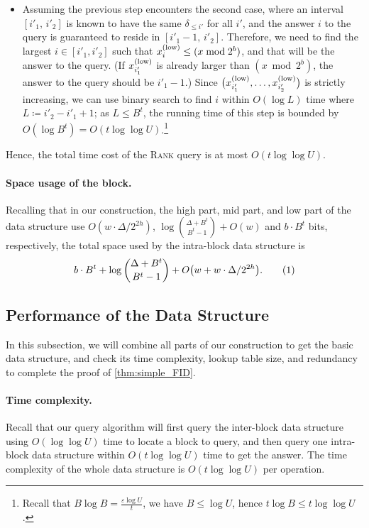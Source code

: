 \documentclass{article}
\theoremstyle{plain}
\theoremstyle{definition}  \newtheorem{definition}[theorem]{Definition}
\DeclarePairedDelimiter{\bk}{(}{)}
\newcommand{\defeq}{\coloneqq}
\newcommand{\eps}{\varepsilon}
\newcommand{\numberthis}{\addtocounter{equation}{1}\tag{\theequation}}
\newcommand{\xlow}[1][i]{x_{#1}^{(\textup{low})}}
\newcommand{\rank}{\textup{\textsc{Rank}}\xspace}
\begin{document}
\begin{itemize}
\item Assuming the previous step encounters the second case, where an interval $[i'_1, \, i'_2]$ is known to have the same $\delta_{\le i'}$ for all $i'$, and the answer $i$ to the query is guaranteed to reside in $[i'_1 - 1, \, i'_2]$. Therefore, we need to find the largest $i \in [i'_1, i'_2]$ such that $\xlow[i] \le (x \bmod 2^b)$, and that will be the answer to the query. (If $\xlow[i'_1]$ is already larger than $(x \bmod 2^b)$, the answer to the query should be $i'_1 - 1$.) 
  Since $\bk[\big]{\xlow[i'_1], \ldots, \xlow[i'_2]}$ is strictly increasing, we can use binary search to find $i$ within $O(\log L)$ time where $L \defeq i'_2 - i'_1 + 1$; as $L \le B^t$, the running time of this step is bounded by $O(\log B^t) = O(t \log \log U)$.\footnote{Recall that $B \log B = \frac{\eps \log U}{t}$, we have $B \le \log U$, hence $t\log B \le t \log \log U$.}
\end{itemize}
Hence, the total time cost of the \rank query is at most $O(t\log \log U)$.

\paragraph*{Space usage of the block.} Recalling that in our construction, the high part, mid part, and low part of the data structure use $O(w \cdot\Delta / 2^{2h})$, $\log \binom{\Delta + B^t}{B^t - 1} + O(w)$ and $b \cdot B^t$ bits, respectively, the total space used by the intra-block data structure is
\begin{align*}
    \label{eq:space_block_simple}
    b \cdot B^t + \log \binom{\Delta + B^t}{B^t - 1} + O\bk*{w + w \cdot \Delta / 2^{2h}}.\numberthis
\end{align*}

\subsection{Performance of the Data Structure}

In this subsection, we will combine all parts of our construction to get the basic data structure, and check its time complexity, lookup table size, and redundancy to complete the proof of \cref{thm:simple_FID}.

\paragraph*{Time complexity.} Recall that our query algorithm will first query the inter-block data structure using $O(\log \log U)$ time to locate a block to query, and then query one intra-block data structure within $O(t \log \log U)$ time to get the answer. The time complexity of the whole data structure is $O(t\log \log U)$ per operation.
\end{document}
